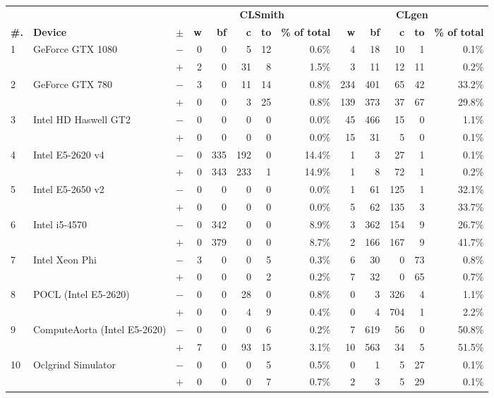   \begin{tabular}{lll | rrrrr | rrrrr }
  \toprule
  & & & \multicolumn{5}{c|}{\textbf{CLSmith}} & \multicolumn{5}{c}{\textbf{CLgen}} \\
  \textbf{\#.} & \textbf{Device} & $\pm$ &
  \textbf{w} & \textbf{bf} & \textbf{c} & \textbf{to} & \textbf{\% of total} &
  \textbf{w} & \textbf{bf} & \textbf{c} & \textbf{to} & \textbf{\% of total} \\
  \midrule
  \multirow{ 2}{*}{1} & \multirow{ 2}{*}{GeForce GTX 1080} & $-$ & 0 & 0 & 5 & 12 & 0.6\%       & 4 & 18 & 10 & 1 & 0.1\% \\& & $+$ & 2 & 0 & 31 & 8 & 1.5\% & 3 & 11 & 12 & 11 & 0.2\% \\
\hline
\multirow{ 2}{*}{2} & \multirow{ 2}{*}{GeForce GTX 780} & $-$ & 3 & 0 & 11 & 14 & 0.8\%       & 234 & 401 & 65 & 42 & 33.2\% \\& & $+$ & 0 & 0 & 3 & 25 & 0.8\% & 139 & 373 & 37 & 67 & 29.8\% \\
\hline
\multirow{ 2}{*}{3} & \multirow{ 2}{*}{Intel HD Haswell GT2} & $-$ & 0 & 0 & 0 & 0 & 0.0\%       & 45 & 466 & 15 & 0 & 1.1\% \\& & $+$ & 0 & 0 & 0 & 0 & 0.0\% & 15 & 31 & 5 & 0 & 0.1\% \\
\hline
\multirow{ 2}{*}{4} & \multirow{ 2}{*}{Intel E5-2620 v4} & $-$ & 0 & 335 & 192 & 0 & 14.4\%       & 1 & 3 & 27 & 1 & 0.1\% \\& & $+$ & 0 & 343 & 233 & 1 & 14.9\% & 1 & 8 & 72 & 1 & 0.2\% \\
\hline
\multirow{ 2}{*}{5} & \multirow{ 2}{*}{Intel E5-2650 v2} & $-$ & 0 & 0 & 0 & 0 & 0.0\%       & 1 & 61 & 125 & 1 & 32.1\% \\& & $+$ & 0 & 0 & 0 & 0 & 0.0\% & 5 & 62 & 135 & 3 & 33.7\% \\
\hline
\multirow{ 2}{*}{6} & \multirow{ 2}{*}{Intel i5-4570} & $-$ & 0 & 342 & 0 & 0 & 8.9\%       & 3 & 362 & 154 & 9 & 26.7\% \\& & $+$ & 0 & 379 & 0 & 0 & 8.7\% & 2 & 166 & 167 & 9 & 41.7\% \\
\hline
\multirow{ 2}{*}{7} & \multirow{ 2}{*}{Intel Xeon Phi} & $-$ & 3 & 0 & 0 & 5 & 0.3\%       & 6 & 30 & 0 & 73 & 0.8\% \\& & $+$ & 0 & 0 & 0 & 2 & 0.2\% & 7 & 32 & 0 & 65 & 0.7\% \\
\hline
\multirow{ 2}{*}{8} & \multirow{ 2}{*}{POCL (Intel E5-2620)} & $-$ & 0 & 0 & 28 & 0 & 0.8\%       & 0 & 3 & 326 & 4 & 1.1\% \\& & $+$ & 0 & 0 & 4 & 9 & 0.4\% & 0 & 4 & 704 & 1 & 2.2\% \\
\hline
\multirow{ 2}{*}{9} & \multirow{ 2}{*}{ComputeAorta (Intel E5-2620)} & $-$ & 0 & 0 & 0 & 6 & 0.2\%       & 7 & 619 & 56 & 0 & 50.8\% \\& & $+$ & 7 & 0 & 93 & 15 & 3.1\% & 10 & 563 & 34 & 5 & 51.5\% \\
\hline
\multirow{ 2}{*}{10} & \multirow{ 2}{*}{Oclgrind Simulator} & $-$ & 0 & 0 & 0 & 5 & 0.5\%       & 0 & 1 & 5 & 27 & 0.1\% \\& & $+$ & 0 & 0 & 0 & 7 & 0.7\% & 2 & 3 & 5 & 29 & 0.1\% \\
  \bottomrule
\end{tabular}

